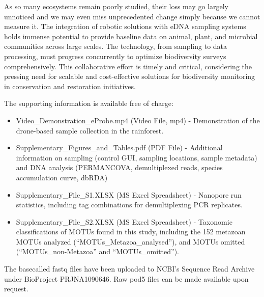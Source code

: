 As so many ecosystems remain poorly studied, their loss may go largely unnoticed and we may even miss unprecedented change simply because we cannot measure it. The integration of robotic solutions with \gls{eDNA} sampling systems holds immense potential to provide baseline data on animal, plant, and microbial communities across large scales. The technology, from sampling to data processing, must progress concurrently to optimize biodiversity surveys comprehensively. This collaborative effort is timely and critical, considering the pressing need for scalable and cost-effective solutions for biodiversity monitoring in conservation and restoration initiatives.

\begin{suppinfo}

The supporting information is available free of charge:
\begin{itemize}
  \item Video\_Demonstration\_eProbe.mp4 (Video File, mp4) - Demonstration of the drone-based sample collection in the rainforest.
  \item Supplementary\_Figures\_and\_Tables.pdf (PDF File) - Additional information on sampling (control GUI, sampling locations, sample metadata) and DNA analysis (PERMANCOVA, demultiplexed reads, species accumulation curve, dbRDA)
  \item Supplementary\_File\_S1.XLSX (MS Excel Spreadsheet) - Nanopore run statistics, including tag combinations for demultiplexing PCR replicates.
  \item Supplementary\_File\_S2.XLSX (MS Excel Spreadsheet) - Taxonomic classifications of MOTUs found in this study, including the 152 metazoan MOTUs analyzed (“MOTUs\_Metazoa\_analysed”), and MOTUs omitted (“MOTUs\_non-Metazoa” and “MOTUs\_omitted”). 
\end{itemize}

The basecalled fastq files have been uploaded to NCBI’s Sequence Read Archive under BioProject PRJNA1090646. Raw pod5 files can be made available upon request. 

\end{suppinfo}

